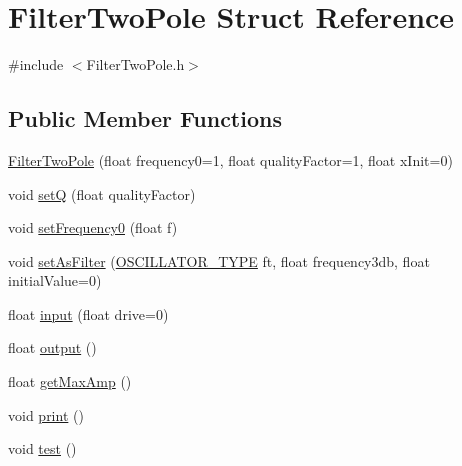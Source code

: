 \hypertarget{struct_filter_two_pole}{}\section{Filter\+Two\+Pole Struct Reference}
\label{struct_filter_two_pole}


{\ttfamily \#include $<$Filter\+Two\+Pole.\+h$>$}

\subsection*{Public Member Functions}
\begin{DoxyCompactItemize}
\item 
\hyperlink{struct_filter_two_pole_a211ce9be7fd6863d5cf6cc4b6bd7b8d9}{Filter\+Two\+Pole} (float frequency0=1, float quality\+Factor=1, float x\+Init=0)
\item 
void \hyperlink{struct_filter_two_pole_ad74accd8618604291a9153ccaba856a6}{setQ} (float quality\+Factor)
\item 
void \hyperlink{struct_filter_two_pole_ab50ffd53b3c0d563c245dc728ae23973}{set\+Frequency0} (float f)
\item 
void \hyperlink{struct_filter_two_pole_a65e7ce2eaa6b3c5a79c05b47a00466ad}{set\+As\+Filter} (\hyperlink{_filter_two_pole_8h_a4a3542ab8ed87461cd4afffaaa23448c}{O\+S\+C\+I\+L\+L\+A\+T\+O\+R\+\_\+\+T\+Y\+PE} ft, float frequency3db, float initial\+Value=0)
\item 
float \hyperlink{struct_filter_two_pole_a77a802a3767a4d55290fb581a557f2ee}{input} (float drive=0)
\item 
float \hyperlink{struct_filter_two_pole_a55a8b2160b02117d9c054161eeee0452}{output} ()
\item 
float \hyperlink{struct_filter_two_pole_a3eca794cde885b64dd1ff9236b3e4368}{get\+Max\+Amp} ()
\item 
void \hyperlink{struct_filter_two_pole_ac86c21f0dcef76c06fe1102fb7642f2d}{print} ()
\item 
void \hyperlink{struct_filter_two_pole_a9d600c9c4c07239f34740f07a1487c2a}{test} ()
\end{DoxyCompactItemize}

